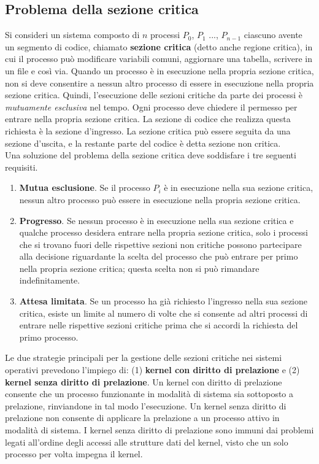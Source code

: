 \documentclass[11pt,a4paper]{article}
\begin{document}
\subsection{Problema della sezione critica}
Si consideri un sistema composto di $n$ processi {$P_0$, $P_1$ ..., $P_{n-1}$} ciascuno avente un segmento di codice, chiamato \textbf{sezione critica} (detto anche regione critica), in cui il processo può
modificare variabili comuni, aggiornare una tabella, scrivere in un file e così via. Quando un
processo è in esecuzione nella propria sezione critica, non si deve consentire a nessun altro
processo di essere in esecuzione nella propria sezione critica. Quindi, l'esecuzione delle sezioni critiche da parte dei processi è \emph{mutuamente esclusiva} nel tempo. Ogni processo deve chiedere il permesso per entrare nella propria sezione critica. La se­zione di codice che realizza questa richiesta è la sezione d'ingresso. La sezione critica può
essere seguita da una sezione d'uscita, e la restante parte del codice è detta sezione non critica.
\medskip\\
Una soluzione del problema della sezione critica deve soddisfare i tre seguenti requisiti.
\begin{enumerate}[noitemsep, leftmargin=*]
  \item \textbf{Mutua esclusione}. Se il processo $P_i$ è in esecuzione nella sua sezione critica, nessun al­tro processo può essere in esecuzione nella propria sezione critica.
  \item \textbf{Progresso}. Se nessun processo è in esecuzione nella sua sezione critica e qualche pro­cesso desidera entrare nella propria sezione critica, solo i processi che si trovano fuori
  delle rispettive sezioni non critiche possono partecipare alla decisione riguardante la
  scelta del processo che può entrare per primo nella propria sezione critica; questa scel­ta non si può rimandare indefinitamente.
  \item \textbf{Attesa limitata}. Se un processo ha già richiesto l'ingresso nella sua sezione critica, esi­ste un limite al numero di volte che si consente ad altri processi di entrare nelle rispet­tive sezioni critiche prima che si accordi la richiesta del primo processo.
\end{enumerate}
%
Le due strategie principali per la gestione delle sezioni critiche nei sistemi operativi
prevedono l'impiego di: (1) \textbf{kernel con diritto di prelazione} e (2) \textbf{kernel senza diritto di prelazione}. Un kernel con diritto di prelazione consente che un processo funzionante in
modalità di sistema sia sottoposto a prelazione, rinviandone in tal modo l'esecuzione. Un
kernel senza diritto di prelazione non consente di applicare la prelazione a un processo atti­vo in modalità di sistema.
I kernel senza diritto di prelazione sono immuni dai problemi legati all'ordine degli accessi alle strut­ture dati del kernel, visto che un solo processo per volta impegna il kernel.
\end{document}
